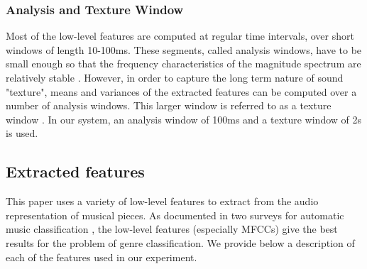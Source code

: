 \documentclass[a4paper,11pt,oneside]{article}
\begin{document}
\subsubsection*{Analysis and Texture Window}
Most of the low-level features are computed at regular time intervals, over short windows of length 10-100ms.
These segments, called analysis windows, have to be small enough so that the frequency characteristics
of the magnitude spectrum are relatively stable \cite{tzan}. However, in order to capture the long term nature 
of sound "texture", means and variances of the extracted features can be computed over a number of analysis windows.
This larger window is referred to as a texture window \cite{tzan}. In our system, an analysis window of 100ms and a 
texture window of 2s is used.
\subsection{Extracted features}\label{exft}
This paper uses a variety of low-level features to extract from the audio representation of musical pieces.
As documented in two surveys for automatic music classification \cite{survey1,survey2}, the low-level
features (especially MFCCs) give the best results for the problem of genre classification. We provide below
a description of each of the features used in our experiment.
\end{document}
